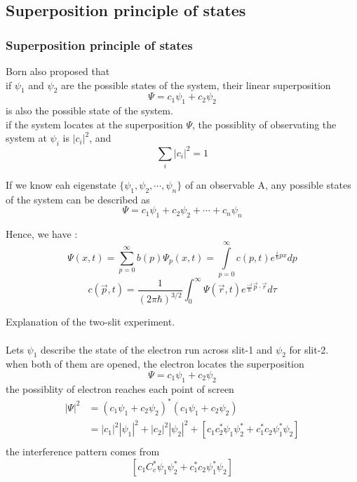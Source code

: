 \subsection{Superposition principle of states}
\begin{frame}
    \frametitle{Superposition principle of states}
    \begin{tcolorbox}[colback=yellow!10,colframe=red!75!black,title=]
    Born also proposed that \\
    \bullet if $\psi_1$ and $\psi_2$ are the possible states of the system,
    their linear superposition \[ \Psi=c_1 \psi_1+ c_2\psi_2 \]
    is also the possible state of the system.\\
    \bullet if the system locates at the superposition $\Psi$, the possiblity of observating the system at $\psi_i$ is $|c_i|^2$, and 
    \[\sum_i |c_i|^2 =1\]
    \end{tcolorbox}
\end{frame}

\begin{frame}
    \begin{corollary}
    If we know eah eigenstate $\{ \psi_1,\psi_2,\cdots,\psi_n \}$ of an observable A, 
    any possible states of the system can be described as \[ \Psi=c_1 \psi_1+ c_2\psi_2+\cdots+c_n\psi_n\] 
    \end{corollary}
    Hence, we have :
    \begin{equation*}
        \Psi(x,t)=\sum\limits_{p=0} ^{\infty} b(p)\Psi_p(x,t) = \int\limits_{p=0} ^{\infty} c(p,t) e^{\frac{i}{\hbar}px}dp
    \end{equation*}
    \[ c(\vec{p},t)=\frac{1}{(2\pi\hbar)^{3/2}} \int_{0}^{\infty} \Psi(\vec{r},t) e^{\frac{-i}{\hbar} \vec{p}\cdot \vec{r} } d \tau \] 
\end{frame}

\begin{frame}
    Explanation of the two-slit experiment.\\
    ~~\\
    \bullet Lets $\psi_1$ describe the state of the electron run across slit-1 and $\psi_2$ for slit-2. \\
    \bullet when both of them are opened, the electron locates the superposition 
    \[ \Psi=c_1 \psi_1+ c_2\psi_2 \]
    \bullet the possiblity of electron reaches each point of screen 
    \begin{equation*}
        \begin{split}
            |\Psi|^2 &= (c_1 \psi_1+ c_2\psi_2)^* (c_1 \psi_1+ c_2\psi_2) \\
            & = |c_1|^2 |\psi_1|^2 + |c_2|^2 |\psi_2|^2  + [c_1 c_2 ^* \psi_1 \psi_2 ^* + c_1 ^* c_2 \psi_1 ^* \psi_2] \\
        \end{split} 
     \end{equation*}
     \bullet the interference pattern comes from  
     \[[c_1 C_c ^* \psi_1 \psi_2 ^* + c_1 ^* c_2 \psi_1 ^* \psi_2] \]
\end{frame}

